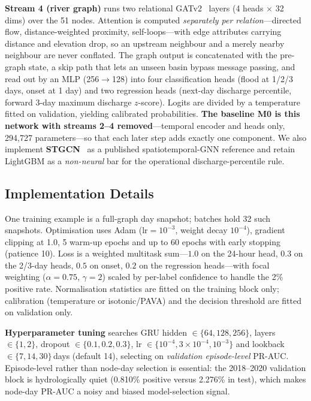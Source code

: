 \documentclass[sigconf]{acmart}
\begin{document}
\textbf{Stream 4 (river graph)} runs two relational GATv2~\cite{GATv2} layers (4 heads $\times$ 32 dims) over the 51 nodes. Attention is computed \emph{separately per relation}---directed flow, distance-weighted proximity, self-loops---with edge attributes carrying distance and elevation drop, so an upstream neighbour and a merely nearby neighbour are never conflated. The graph output is concatenated with the pre-graph state, a skip path that lets an unseen basin bypass message passing, and read out by an MLP (256$\to$128) into four classification heads (flood at 1/2/3 days, onset at 1 day) and two regression heads (next-day discharge percentile, forward 3-day maximum discharge $z$-score). Logits are divided by a temperature fitted on validation, yielding calibrated probabilities. \textbf{The baseline M0 is this network with streams 2--4 removed}---temporal encoder and heads only, 294,727 parameters---so that each later step adds exactly one component. We also implement \textbf{STGCN}~\cite{STGCN2018} as a published spatiotemporal-GNN reference and retain LightGBM as a \emph{non-neural} bar for the operational discharge-percentile rule.

\subsection{Implementation Details}

One training example is a full-graph day snapshot; batches hold 32 such snapshots. Optimisation uses Adam ($\text{lr}=10^{-3}$, weight decay $10^{-4}$), gradient clipping at 1.0, 5 warm-up epochs and up to 60 epochs with early stopping (patience 10). Loss is a weighted multitask sum---$1.0$ on the 24-hour head, $0.3$ on the 2/3-day heads, $0.5$ on onset, $0.2$ on the regression heads---with focal weighting ($\alpha{=}0.75$, $\gamma{=}2$) scaled by per-label confidence to handle the 2\% positive rate. Normalisation statistics are fitted on the training block only; calibration (temperature or isotonic/PAVA) and the decision threshold are fitted on validation only.

\textbf{Hyperparameter tuning} searches GRU hidden $\in\{64,128,256\}$, layers $\in\{1,2\}$, dropout $\in\{0.1,0.2,0.3\}$, lr $\in\{10^{-4},3\!\times\!10^{-4},10^{-3}\}$ and lookback $\in\{7,14,30\}$\,days (default 14), selecting on \emph{validation episode-level} PR-AUC. Episode-level rather than node-day selection is essential: the 2018--2020 validation block is hydrologically quiet (0.810\% positive versus 2.276\% in test), which makes node-day PR-AUC a noisy and biased model-selection signal.
\end{document}
